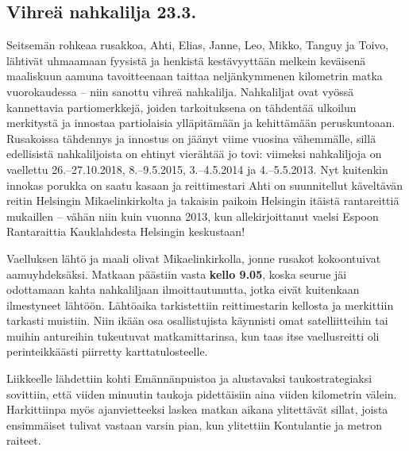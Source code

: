 \clearpage
\subsection{Vihreä nahkalilja 23.3.}

\begin{multicols}{2}

	Seitsemän rohkeaa rusakkoa, \mbox{Ahti}, Elias, Janne, Leo, Mikko,
	\mbox{Tanguy} ja Toivo, lähtivät uhmaamaan fyysistä ja henkistä kestävyyttään
	melkein keväisenä maaliskuun aamuna tavoitteenaan taittaa
	neljänkymmenen kilometrin matka vuorokaudessa – niin sanottu vihreä
	nahkalilja. Nahkaliljat ovat vyössä kannettavia partiomerkkejä, joiden
	tarkoituksena on tähdentää ulkoilun merkitystä ja innostaa partiolaisia
	ylläpitämään ja kehittämään peruskuntoaan. Rusakoissa tähdennys ja
	innostus on jäänyt viime vuosina vähemmälle, sillä edellisistä
	nahkaliljoista on ehtinyt vierähtää jo tovi: viimeksi nahkaliljoja on
	vaellettu 26.–27.10.2018, 8.–9.5.2015, 3.–4.5.2014 ja 4.–5.5.2013. Nyt
	kuitenkin innokas porukka on saatu kasaan ja reittimestari Ahti on
	suunnitellut käveltävän reitin Helsingin Mikaelinkirkolta ja takaisin
	paikoin Helsingin itäistä rantareittiä mukaillen – vähän niin kuin
	vuonna 2013, kun allekirjoittanut vaelsi Espoon Rantaraittia
	Kauklahdesta Helsingin keskustaan!

	Vaelluksen lähtö ja maali olivat Mikaelinkirkolla, jonne rusakot
	kokoontuivat aamuyhdeksäksi. Matkaan päästiin vasta \textbf{kello
	9.05}, koska seurue jäi odottamaan kahta nahkaliljaan ilmoittautunutta,
	jotka eivät kuitenkaan ilmestyneet lähtöön. Lähtöaika tarkistettiin
	reittimestarin kellosta ja merkittiin tarkasti muistiin. Niin ikään osa
	osallistujista käynnisti omat satelliitteihin tai muihin antureihin
	tukeutuvat matkamittarinsa, kun taas itse vaellusreitti oli
	perinteikkäästi piirretty karttatulosteelle.

	Liikkeelle lähdettiin kohti Emännänpuistoa ja alustavaksi
	taukostrategiaksi sovittiin, että viiden minuutin taukoja pidettäisiin
	aina viiden kilometrin välein. Harkittiinpa myös ajanvietteeksi laskea
	matkan aikana ylitettävät sillat, joista ensimmäiset tulivat vastaan
	varsin pian, kun ylitettiin Kontulantie ja metron raiteet.


\end{multicols}
